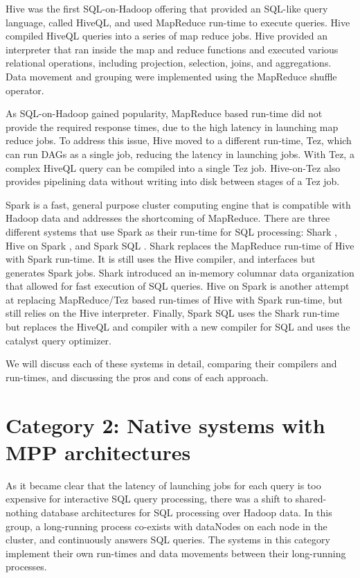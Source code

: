 \documentclass{vldb}
\begin{document}
Hive \cite{hive} was the first SQL-on-Hadoop offering that provided an SQL-like query language, called HiveQL, and used MapReduce run-time to execute queries. Hive compiled HiveQL queries into a series of map reduce jobs. Hive provided an interpreter that ran inside the map and reduce functions and executed various relational operations, including projection, selection, joins, and aggregations. Data movement and grouping were implemented using the MapReduce shuffle operator.

As SQL-on-Hadoop gained popularity, MapReduce based run-time did not provide the required response times, due to the high latency in launching map reduce jobs. To address this issue, Hive moved to a different run-time, Tez, which can run DAGs as a single job, reducing the latency in launching jobs. With Tez, a complex HiveQL query can be compiled into a single Tez job. Hive-on-Tez also provides pipelining data without writing into disk between stages of a Tez job.

Spark is a fast, general purpose cluster computing engine that is compatible with Hadoop data and addresses the shortcoming of MapReduce. There are three different systems that use Spark as their run-time for SQL processing: Shark \cite{sharksigmod13}, Hive on Spark \cite{hiveOnSpark}, and Spark SQL \cite{sparkSQL}. Shark replaces the MapReduce run-time of Hive \cite{hive} with Spark run-time. It is still uses the Hive compiler, and interfaces but generates Spark jobs. Shark introduced an in-memory columnar data organization that allowed for fast execution of SQL queries. Hive on Spark is another attempt at replacing MapReduce/Tez based run-times of Hive with Spark run-time, but still relies on the Hive interpreter. Finally, Spark SQL uses the Shark \cite{sharksigmod13} run-time but replaces the HiveQL and compiler with a new compiler for SQL and uses the catalyst query optimizer.

We will discuss each of these systems in detail, comparing their compilers and run-times, and discussing the pros and cons of each approach.


\section{Category 2: Native systems with MPP architectures}

As it became clear that the latency of launching jobs for each query is too expensive for interactive SQL query processing, there was a shift to shared-nothing database architectures for SQL processing over Hadoop data. In this group, a long-running process co-exists with dataNodes on each node in the cluster, and continuously answers SQL queries. The systems in this category implement their own run-times and data movements between their long-running processes. 
\end{document}
